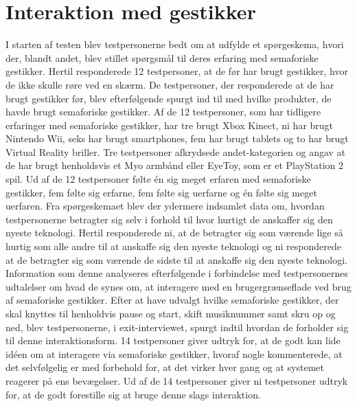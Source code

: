\section{Interaktion med gestikker}
\label{TestresultaterInteraktioner}
%
I starten af testen blev testpersonerne bedt om at udfylde et spørgeskema, hvori der, blandt andet, blev stillet spørgsmål til deres erfaring med semaforiske gestikker. Hertil responderede 12 testpersoner, at de før har brugt gestikker, hvor de ikke skulle røre ved en skærm. De testpersoner, der responderede at de har brugt gestikker før, blev efterfølgende spurgt ind til med hvilke produkter, de havde brugt semaforiske gestikker. Af de 12 testpersoner, som har tidligere erfaringer med semaforiske gestikker, har tre brugt Xbox Kinect, ni har brugt Nintendo Wii, seks har brugt smartphones, fem har brugt tablets og to har brugt Virtual Reality briller. Tre testpersoner afkrydsede andet-kategorien og angav at de har brugt henholdsvis et Myo armbånd eller EyeToy, som er et PlayStation 2 spil. Ud af de 12 testpersoner følte én sig meget erfaren med semaforiske gestikker, fem følte sig erfarne, fem følte sig uerfarne og én følte sig meget uerfaren. Fra spørgeskemaet blev der ydermere indsamlet data om, hvordan testpersonerne betragter sig selv i forhold til hvor hurtigt de anskaffer sig den nyeste teknologi. Hertil responderede ni, at de betragter sig som værende lige så hurtig som alle andre til at anskaffe sig den nyeste teknologi og ni responderede at de betragter sig som værende de sidste til at anskaffe sig den nyeste teknologi. Information som denne analyseres efterfølgende i forbindelse med testpersonernes udtalelser om hvad de synes om, at interagere med en brugergrænseflade ved brug af semaforiske gestikker. \blankline
%
Efter at have udvalgt hvilke semaforiske gestikker, der skal knyttes til henholdvis pause og start, skift musiknummer samt skru op og ned, blev testpersonerne, i exit-interviewet, spurgt indtil hvordan de forholder sig til denne interaktionsform. 14 testpersoner giver udtryk for, at de godt kan lide idéen om at interagere via semaforiske gestikker, hvoraf nogle kommenterede, at det selvfølgelig er med forbehold for, at det virker hver gang og at systemet reagerer på ens bevægelser. Ud af de 14 testpersoner giver ni testpersoner udtryk for, at de godt forestille sig at bruge denne slags interaktion. 

